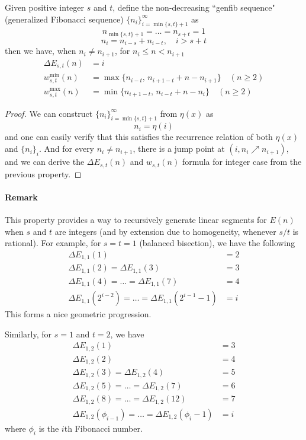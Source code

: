 \documentclass[]{article}
\begin{document}
\vspace{1cm}
\begin{lemma}[Fibonacci]
	Given positive integer $s$ and $t$, define the non-decreasing ``genfib sequence" (generalized Fibonacci sequence) $\{n_i\}_{i=\min\{s,t\}+1}^\infty$ as
	\[
	n_{\min\{s,t\}+1} = \dots = n_{s + t} = 1
	\]
	\[
	n_{i} = n_{i - s} + n_{i - t} , \quad i > s + t
	\]
	then we have, when $n_i \neq n_{i+1}$, for $n_i \le n < n_{i+1}$
	\begin{align*}
	\Delta E_{s,t}(n) &= i\\
	w^{\min}_{s,t}(n) &= \max\{n_{i - t},\, n_{i +1 - t} + n - n_{i+1}\}\quad(n\geq 2)	\\
	w^{\max}_{s,t}(n) &= \min\{n_{i +1 - t},\,n_{i - t} + n - n_{i} \} \quad(n\geq 2)
	\end{align*}
\end{lemma}
\begin{proof}
	We can construct $\{n_i\}_{i=\min\{s,t\}+1}^{\infty}$ from $\eta(x)$ as
	\[
	n_i = \eta(i)
	\]
	and one can easily verify that this satisfies the recurrence relation of both $\eta(x)$ and $\{n_i\}_{i}$. And for every $n_i \neq n_{i+1}$, there is a jump point at $(i,n_i\nearrow n_{i+1})$, and we can derive the $\Delta E_{s,t}(n)$ and $w_{s,t}(n)$ formula for integer case from the previous property.
	
\end{proof}	

\paragraph{Remark}

This property provides a way to recursively generate linear segments for $E(n)$ when $s$ and $t$ are integers (and by extension due to homogeneity, whenever $s/t$ is rational). For example, for $s = t = 1$ (balanced bisection), we have the following
\begin{align*}
\Delta E_{1,1}(1) &= 2 \\
\Delta E_{1,1}(2) = \Delta E_{1,1}(3) &= 3\\
\Delta E_{1,1}(4) =\dots = \Delta E_{1,1}(7) &= 4\\
\Delta E_{1,1}(2^{i-2}) =\dots = \Delta E_{1,1}(2^{i-1}-1) &= i
\end{align*}
This forms a nice geometric progression.

Similarly, for $s = 1$ and $t = 2$, we have 
\begin{align*}
\Delta E_{1,2}(1) &= 3 \\
\Delta E_{1,2}(2) &= 4\\
\Delta E_{1,2}(3)  = \Delta E_{1,2}(4) &= 5\\
\Delta E_{1,2}(5) =\dots = \Delta E_{1,2}(7) &= 6\\
\Delta E_{1,2}(8) =\dots = \Delta E_{1,2}(12) &= 7\\
\Delta E_{1,2}(\phi_{i -1}) =\dots = \Delta E_{1,2}(\phi_{i} - 1) &= i
\end{align*}
where $\phi_i$ is the $i$th Fibonacci number.
\end{document}
